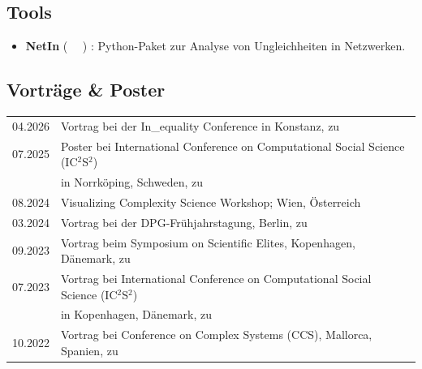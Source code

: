 \documentclass[11pt]{article} %
\begin{document}
\subsection*{Tools}
%
\begin{itemize}
    \item \textbf{NetIn} (~\href{https://pypi.org/project/netin/}{\faPython}
        \hspace{0.5em}\href{https://github.com/CSHVienna/NetworkInequalities}{\faGithub}
        \hspace{0.5em}\href{https://cshvienna.github.io/NetworkInequalities/}{\faFile*[regular]}~)
        : Python-Paket zur Analyse von Ungleichheiten in Netzwerken.

\end{itemize}

\subsection*{Vorträge \& Poster}
\begin{longtable}[l]{@{}p{} p{}}
  04.2026     & Vortrag bei der In\_equality Conference in Konstanz, zu~\cite{bachmann.etal_networkinequalitypreferential_2026}\\
  07.2025     & Poster bei International Conference on Computational Social Science (IC$^2$S$^2$)\\
              & in Norrk\"oping, Schweden, zu~\cite{bachmann.etal_networkinequalitypreferential_2026}\\
  08.2024     & Visualizing Complexity Science Workshop; Wien, Österreich\\
  03.2024     & Vortrag bei der DPG-Frühjahrstagung, Berlin, zu~\cite{bachmann.etal_cumulativeadvantagebrokerage_2026}\\
  09.2023     & Vortrag beim Symposium on Scientific Elites, Kopenhagen, Dänemark, zu~\cite{bachmann.etal_cumulativeadvantagebrokerage_2026}\\
  07.2023     & Vortrag bei International Conference on Computational Social Science (IC$^2$S$^2$)\\
              & in Kopenhagen, Dänemark, zu~\cite{bachmann.etal_cumulativeadvantagebrokerage_2026}\\
  10.2022     & Vortrag bei Conference on Complex Systems (CCS), Mallorca, Spanien, zu~\cite{bachmann.etal_cumulativeadvantagebrokerage_2026}
\end{longtable}
\end{document}
